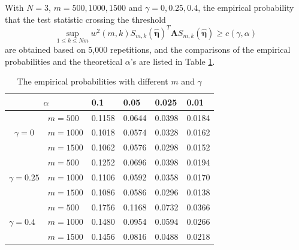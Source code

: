 \documentclass{article}
\theoremstyle{definition}
\begin{document}
\noindent
With $N = 3$, $m=500, 1000,1500$ and $\gamma = 0,0.25,0.4$, the empirical probability that the test statistic crossing the threshold 
$$\underset{1\leq k \leq Nm}{\sup} w^2(m,k)S_{m,k}(\hat{\bm{\eta}})^T\bm{A}S_{m,k}(\hat{\bm{\eta}}) \geq c(\gamma, \alpha)$$
are obtained based on 5,000 repetitions, and the comparisons of the empirical probabilities and the theoretical $\alpha$'s are listed in Table \ref{table:null alpha compare}.
\begin{table}[!htb]
\centering
\begin{tabular}{llllll}
\hline
\multicolumn{2}{c}{$\alpha$}                                & 0.1    & 0.05                       & 0.025  & 0.01   \\ \hline
\multicolumn{1}{c}{\multirow{3}{*}{$\gamma = 0$}} & $m=500$ & 0.1158 & 0.0644& 0.0398& 0.0184 \\
\multicolumn{1}{c}{}                              & $m=1000$ & 0.1018 & 0.0574 & 0.0328 & 0.0162 \\
\multicolumn{1}{c}{}                              & $m=1500$ & 0.1062 & 0.0576 & 0.0298 & 0.0152 \\ \hline
\multirow{3}{*}{$\gamma = 0.25$}                  & $m=500$ & 0.1252& 0.0696& 0.0398& 0.0194 \\
                                                  & $m=1000$ & 0.1106& 0.0592& 0.0358& 0.0170 \\
                                                  & $m=1500$ & 0.1086& 0.0586& 0.0296& 0.0138 \\ \hline
\multirow{3}{*}{$\gamma = 0.4$}                   & $m=500$ & 0.1756&0.1168& 0.0732& 0.0366 \\
                                                  & $m=1000$ & 0.1480 & 0.0954& 0.0594& 0.0266 \\
                                                  & $m=1500$ & 0.1456& 0.0816& 0.0488& 0.0218\\ \hline
\end{tabular}
\caption{The empirical probabilities with different $m$ and $\gamma$}\label{table:null alpha compare}
\end{table}
\end{document}
